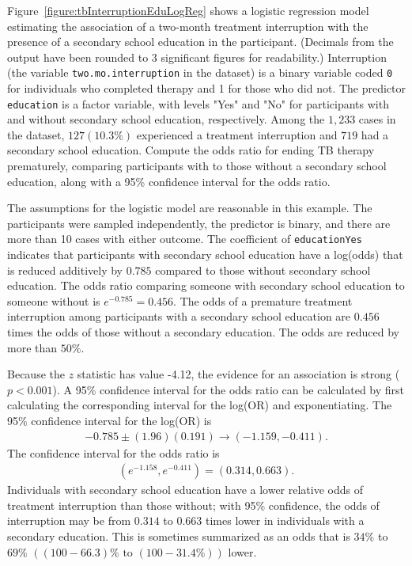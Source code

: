 \begin{examplewrap} \label{example:tbInterruptionEducation}
  \begin{nexample}  {Figure~\ref{figure:tbInterruptionEduLogReg} shows a logistic regression model estimating the association of a two-month treatment interruption with the presence of a secondary school education in the participant. (Decimals from the output have been rounded to 3 significant figures for readability.) Interruption (the variable \texttt{two.mo.interruption} in the dataset) is a binary variable coded \texttt{0} for individuals who completed therapy and 1 for those who did not. The predictor \texttt{education} is a factor variable, with levels {"Yes"} and {"No"} for participants with and without secondary school education, respectively.  Among the $1,233$ cases in the dataset, $127 (10.3\%)$ experienced a treatment interruption and $719$ had a secondary school education. Compute the odds ratio for ending TB therapy prematurely, comparing participants with to those without a secondary school education, along with a 95\% confidence interval for the odds ratio.}

The assumptions for the logistic model are reasonable in this example. The participants were sampled independently, the predictor is binary, and there are more than 10 cases with either outcome.  The coefficient of \texttt{educationYes} indicates that participants with secondary school education have a log(odds) that is reduced additively by $0.785$ compared to those without secondary school education.  The odds ratio comparing someone with secondary school education to someone without is $e^{-0.785}=0.456.$  The odds of a premature treatment interruption among participants with a secondary school education are $0.456$ times the odds of those without a secondary education.  The odds are reduced by more than $50\%$.

Because the $z$ statistic has value -4.12, the evidence for an association is strong ($p < 0.001$).  A 95\% confidence interval for the odds ratio can be calculated by first calculating the corresponding interval for the log(OR) and exponentiating.  The 95\% confidence interval for the log(OR) is
\begin{align*}
  -0.785 \pm (1.96)(0.191) \longrightarrow (-1.159,-0.411).
\end{align*}
The confidence interval for the odds ratio is
\begin{align*}
  (e^{-1.158}, e^{-0.411}) = (0.314,0.663).
\end{align*}
    Individuals with secondary school education have a lower relative odds of treatment interruption than those without; with 95\% confidence, the odds of interruption may be from $0.314$ to $0.663$ times lower in individuals with a secondary education.  This is sometimes summarized as an odds that is $34\%$ to $69\%$ $((100 - 66.3)\% \text{ to } (100 - 31.4\%))$ lower.

\end{nexample}
\end{examplewrap}

